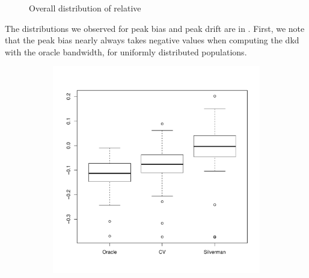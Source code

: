\begin{figure}[htbp]
\begin{subfigure}[t]{0.45\textwidth}
        \label{fig:discussion:overall_peakdrift_boxplot:peak}
    \end{subfigure}
    \caption{Overall distribution of relative }
    \label{fig:discussion:overall_peakdrift_boxplot}
\end{figure}

The distributions we observed for \gls{peak bias} and \gls{peak drift} are in .
First, we note that the \gls{peak bias} nearly always takes negative values when computing the \gls{dkd} with the \gls{oracle} bandwidth,
for uniformly distributed populations.


\begin{figure}[htbp]
    \centering
    \begin{subfigure}[t]{0.45\textwidth}
        \includegraphics[width=\textwidth]{results/by_overall/relative-centroid-bias-boxplot}
        \label{fig:discussion:overall_centroidbias_boxplot:unif}
    \end{subfigure}
    \begin{subfigure}[t]{0.45\textwidth}

\end{subfigure}
\end{figure}
